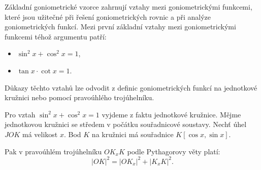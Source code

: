\documentclass[12pt,a4paper]{article}
\begin{document}
Základní goniometrické vzorce zahrnují vztahy mezi goniometrickými funkcemi,
které jsou užitečné při řešení goniometrických rovnic a při analýze goniometrických funkcí.
Mezi první základní vztahy mezi goniometrickými funkcemi téhož argumentu patří:
\begin{itemize}
    \item $\sin^2 x + \cos^2 x = 1$,
    \item $\tan x \cdot \cot x = 1$.
\end{itemize}

Důkazy těchto vztahů lze odvodit z definic goniometrických funkcí na jednotkové kružnici
nebo pomocí pravoúhlého trojúhelníku.

Pro vztah $\sin^2 x + \cos^2 x = 1$ vyjdeme z faktu jednotkové kružnice.
Mějme jednotkovou kružnici se středem v počátku souřadnicové soustavy.
Nechť úhel $JOK$ má velikost $x$. Bod $K$ na kružnici má souřadnice $K[\cos x, \sin x]$.

\begin{center}
\end{center}

Pak v pravoúhlém trojúhelníku $OK_xK$ podle Pythagorovy věty platí:
\[|OK|^2 = |OK_x|^2 + |K_xK|^2.\]
\end{document}
